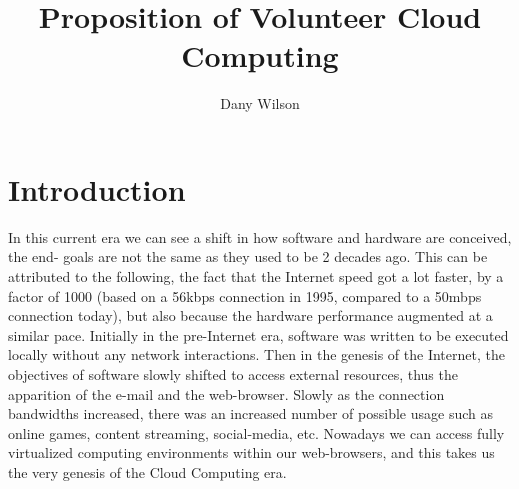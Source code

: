 \documentclass[11pt]{amsart}
\title{Proposition of Volunteer Cloud Computing}
\author{Dany Wilson}
\begin{document}
\maketitle
	\section{Introduction}
	In this current era we can see a shift in how software and hardware are conceived, the end-
	goals are not the same as they used to be 2 decades ago. This can be attributed to the 
	following, the fact that the Internet speed got a lot faster, by a factor of 1000 (based on
	a 56kbps connection in 1995, compared to a 50mbps connection today), but also because the 
	hardware performance augmented at a similar pace. Initially in the pre-Internet era, 
	software was written to be executed locally without any network interactions. Then in the 
	genesis of the Internet, the objectives of software slowly shifted to access external 
	resources, thus the apparition of the e-mail and the web-browser. Slowly as the connection
	bandwidths increased, there was an increased number of possible usage such as online games, 
	content streaming, social-media, etc. Nowadays we can access fully virtualized computing
	environments within our web-browsers, and this takes us the very genesis of the Cloud 
	Computing era. 
\end{document}
